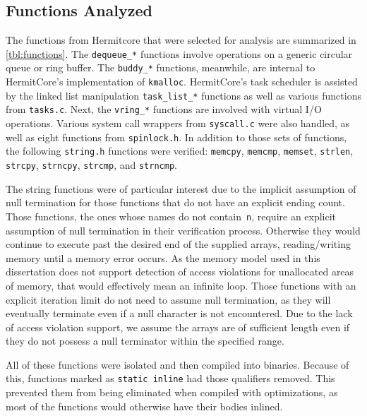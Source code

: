\subsection{Functions Analyzed}
The functions from Hermitcore that were selected for analysis
are summarized in \cref{tbl:functions}.
The \lstinline|dequeue_*| functions
involve operations on a generic circular queue or ring buffer.
The \lstinline|buddy_*| functions, meanwhile,
are internal to HermitCore's implementation of \lstinline|kmalloc|.
HermitCore's task scheduler
is assisted by the linked list manipulation \lstinline|task_list_*| functions
as well as various functions from \lstinline|tasks.c|.
Next, the \lstinline|vring_*| functions are involved with virtual I/O operations.
Various system call wrappers from \lstinline|syscall.c| were also handled,
as well as eight functions from \lstinline|spinlock.h|.
In addition to those sets of functions,
the following \lstinline|string.h| functions were verified:
\lstinline|memcpy|, \lstinline|memcmp|, \lstinline|memset|, \lstinline|strlen|,
\lstinline|strcpy|, \lstinline|strncpy|, \lstinline|strcmp|, and \lstinline|strncmp|.

The string functions were of particular interest
due to the implicit assumption of null termination%
for those functions that do not have an explicit ending count.
Those functions, the ones whose names do not contain~\lstinline|n|,
require an explicit assumption of null termination in their verification process.
Otherwise they would continue to execute past the desired end of the supplied arrays,
reading/writing memory until a memory error occurs.
As the memory model used in this dissertation%
does not support detection of access violations for unallocated areas of memory,
that would effectively mean an infinite loop.
Those functions with an explicit iteration limit
do not need to assume null termination,
as they will eventually terminate even if a null character is not encountered.
Due to the lack of access violation support,
we assume the arrays are of sufficient length
even if they do not possess a null terminator within the specified range.

All of these functions were isolated and then compiled into binaries.
Because of this, functions marked as \lstinline|static inline|
had those qualifiers removed.
This prevented them from being eliminated when compiled with optimizations,
as most of the functions would otherwise have their bodies inlined.

